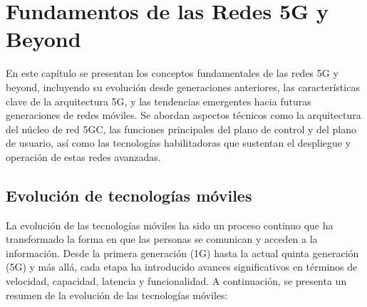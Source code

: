 \chapter{Fundamentos de las Redes 5G y Beyond}
En este capítulo se presentan los conceptos fundamentales de las redes 5G y beyond, incluyendo su evolución desde generaciones anteriores, las características clave de la arquitectura 5G, y las tendencias emergentes hacia futuras generaciones de redes móviles. Se abordan aspectos técnicos como la arquitectura del núcleo de red 5GC, las funciones principales del plano de control y del plano de usuario, así como las tecnologías habilitadoras que sustentan el despliegue y operación de estas redes avanzadas.
\section{Evolución de tecnologías móviles}
La evolución de las tecnologías móviles ha sido un proceso continuo que ha transformado la forma en que las personas se comunican y acceden a la información. Desde la primera generación (1G) hasta la actual quinta generación (5G) y más allá, cada etapa ha introducido avances significativos en términos de velocidad, capacidad, latencia y funcionalidad. A continuación, se presenta un resumen de la evolución de las tecnologías móviles:
